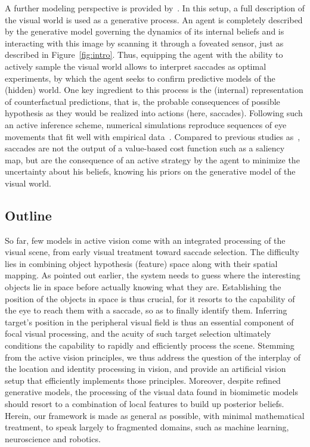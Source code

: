 %
A further modeling perspective is provided by~\cite{Friston12}. In this setup, a full description of the visual world is used as a generative process. An agent is completely described by the generative model governing the dynamics of its internal beliefs and is interacting with this image by scanning it through a foveated sensor, just as described in Figure~\ref{fig:intro}. Thus, equipping the agent with the ability to actively sample the visual world allows to interpret saccades as optimal experiments, by which the agent seeks to confirm predictive models of the (hidden) world. One key ingredient to this process is the (internal) representation of counterfactual predictions, that is, the probable consequences of possible hypothesis as they would be realized into actions (here, saccades). Following such an active inference scheme, numerical simulations reproduce sequences of eye movements that fit well with empirical data~\cite{Mirza18}. Compared to previous studies as~\cite{Najemnik05}, saccades are not the output of a value-based cost function such as a saliency map, but are the consequence of an active strategy by the agent to minimize the uncertainty about his beliefs, knowing his priors on the generative model of the visual world.
%
\subsection{Outline}
%
So far, few models in active vision come with an integrated processing of the visual scene, from early visual treatment toward saccade selection. The difficulty lies in combining object hypothesis (feature) space along with their spatial mapping. As pointed out earlier, the system needs to guess where the interesting objects lie in space before actually knowing what they are. Establishing the position of the objects in space is thus crucial, for it resorts to the capability of the eye to reach them with a saccade, so as to finally identify them. Inferring target's position in the peripheral visual field is thus an essential component of focal visual processing, and the acuity of such target selection ultimately conditions the capability to rapidly and efficiently process the scene. Stemming from the active vision principles, we thus address the question of the interplay of the location and identity processing in vision, and provide an artificial vision setup that efficiently implements those principles. Moreover, despite refined generative models, the processing of the visual data found in biomimetic models should resort to a combination of local features to build up posterior beliefs. Herein, our framework is made as general as possible, with minimal mathematical treatment, to speak largely to fragmented domains, such as machine learning, neuroscience and robotics.

